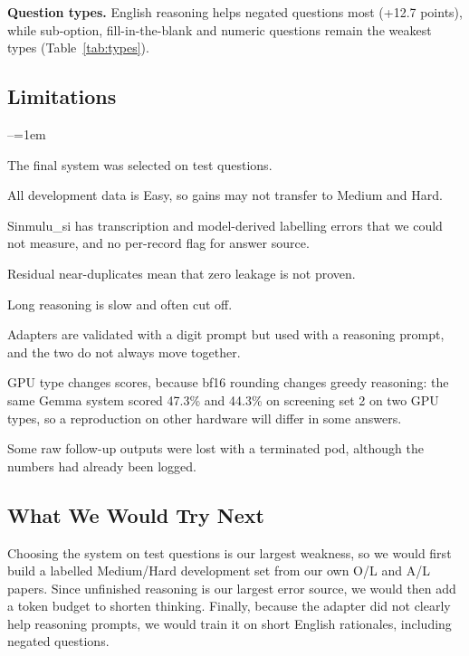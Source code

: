 \documentclass[11pt]{article}
\newcommand{\para}[1]{\smallskip\noindent\textbf{#1}\enspace}
\newcommand{\sinmulu}{Sinmulu\_si}
\begin{document}
\para{Question types.} English reasoning helps negated questions most (+12.7 points), while sub-option, fill-in-the-blank and numeric questions remain the weakest types (Table~\ref{tab:types}).

\subsection{Limitations}
\begin{list}{--}{\leftmargin=1em\itemindent=0pt\itemsep=1pt\parsep=0pt\topsep=2pt}
\item The final system was selected on test questions.
\item All development data is Easy, so gains may not transfer to Medium and Hard.
\item \sinmulu{} has transcription and model-derived labelling errors that we could not measure, and no per-record flag for answer source.
\item Residual near-duplicates mean that zero leakage is not proven.
\item Long reasoning is slow and often cut off.
\item Adapters are validated with a digit prompt but used with a reasoning prompt, and the two do not always move together.
\item GPU type changes scores, because bf16 rounding changes greedy reasoning: the same Gemma system scored 47.3\% and 44.3\% on screening set 2 on two GPU types, so a reproduction on other hardware will differ in some answers.
\item Some raw follow-up outputs were lost with a terminated pod, although the numbers had already been logged.
\end{list}

\subsection{What We Would Try Next}
Choosing the system on test questions is our largest weakness, so we would first build a labelled Medium/Hard development set from our own O/L and A/L papers. Since unfinished reasoning is our largest error source, we would then add a token budget to shorten thinking. Finally, because the adapter did not clearly help reasoning prompts, we would train it on short English rationales, including negated questions.
\end{document}
